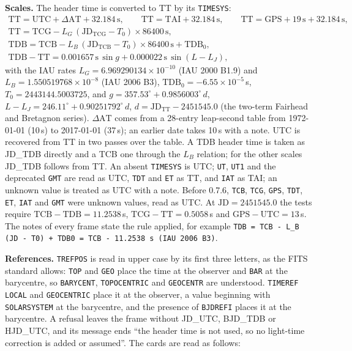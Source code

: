 \documentclass[11pt,a4paper]{article}
\newcommand{\code}[1]{\texttt{\small #1}}
\begin{document}
    \textbf{Scales.} The header time is converted to TT by its \code{TIMESYS}:
    \begin{equation}
    \begin{gathered}
        \text{TT} = \text{UTC} + \Delta\text{AT} + 32.184\,\text{s}, \qquad \text{TT} = \text{TAI} + 32.184\,\text{s}, \qquad \text{TT} = \text{GPS} + 19\,\text{s} + 32.184\,\text{s}, \\
        \text{TT} = \text{TCG} - L_G\,(\text{JD}_{\text{TCG}} - T_0) \times 86400\,\text{s}, \\
        \text{TDB} = \text{TCB} - L_B\,(\text{JD}_{\text{TCB}} - T_0) \times 86400\,\text{s} + \text{TDB}_0, \\
        \text{TDB} - \text{TT} = 0.001657\,\text{s}\,\sin g + 0.000022\,\text{s}\,\sin(L - L_J),
    \end{gathered}
    \end{equation}
    with the IAU rates $L_G = 6.969290134 \times 10^{-10}$ (IAU 2000 B1.9) and $L_B = 1.550519768 \times 10^{-8}$ (IAU 2006 B3), $\text{TDB}_0 = -6.55 \times 10^{-5}$\,s, $T_0 = 2443144.5003725$, and $g = 357.53^{\circ} + 0.9856003^{\circ}\,d$, $L - L_J = 246.11^{\circ} + 0.90251792^{\circ}\,d$, $d = \text{JD}_{\text{TT}} - 2451545.0$ (the two-term Fairhead and Bretagnon series). $\Delta\text{AT}$ comes from a 28-entry leap-second table from 1972-01-01 (10\,s) to 2017-01-01 (37\,s); an earlier date takes 10\,s with a note. UTC is recovered from TT in two passes over the table. A TDB header time is taken as JD\_TDB directly and a TCB one through the $L_B$ relation; for the other scales JD\_TDB follows from TT. An absent \code{TIMESYS} is UTC; \code{UT}, \code{UT1} and the deprecated \code{GMT} are read as UTC, \code{TDT} and \code{ET} as TT, and \code{IAT} as TAI; an unknown value is treated as UTC with a note. Before 0.7.6, \code{TCB}, \code{TCG}, \code{GPS}, \code{TDT}, \code{ET}, \code{IAT} and \code{GMT} were unknown values, read as UTC. At $\text{JD} = 2451545.0$ the tests require $\text{TCB} - \text{TDB} = 11.2538$\,s, $\text{TCG} - \text{TT} = 0.5058$\,s and $\text{GPS} - \text{UTC} = 13$\,s. The notes of every frame state the rule applied, for example \code{TDB = TCB - L\_B (JD - T0) + TDB0 = TCB - 11.2538 s (IAU 2006 B3)}.

    \textbf{References.} \code{TREFPOS} is read in upper case by its first three letters, as the FITS standard allows: \code{TOP} and \code{GEO} place the time at the observer and \code{BAR} at the barycentre, so \code{BARYCENT}, \code{TOPOCENTRIC} and \code{GEOCENTR} are understood. \code{TIMEREF} \code{LOCAL} and \code{GEOCENTRIC} place it at the observer, a value beginning with \code{SOLARSYSTEM} at the barycentre, and the presence of \code{BJDREFI} places it at the barycentre. A refusal leaves the frame without JD\_UTC, BJD\_TDB or HJD\_UTC, and its message ends ``the header time is not used, so no light-time correction is added or assumed''. The cards are read as follows:
\end{document}
